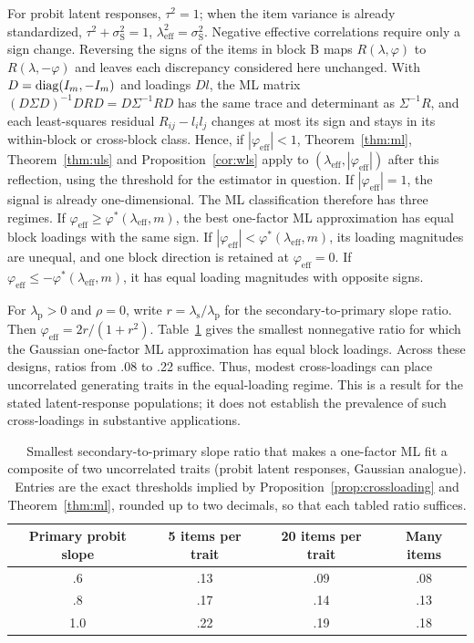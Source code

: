 For probit latent responses, $\tau^2=1$; when the item variance is already standardized, $\tau^2+\sigma_{\mathrm S}^2=1$, $\lambda_{\mathrm{eff}}^2=\sigma_{\mathrm S}^2$. Negative effective correlations require only a sign change. Reversing the signs of the items in block B maps $R(\lambda,\varphi)$ to $R(\lambda,-\varphi)$ and leaves each discrepancy considered here unchanged. With $D=\operatorname{diag}(I_m,-I_m)$ and loadings $Dl$, the ML matrix $(D\Sigma D)^{-1}DRD=D\Sigma^{-1}RD$ has the same trace and determinant as $\Sigma^{-1}R$, and each least-squares residual $R_{ij}-l_il_j$ changes at most its sign and stays in its within-block or cross-block class. Hence, if $|\varphi_{\mathrm{eff}}|<1$, Theorem~\ref{thm:ml}, Theorem~\ref{thm:uls} and Proposition~\ref{cor:wls} apply to $(\lambda_{\mathrm{eff}},|\varphi_{\mathrm{eff}}|)$ after this reflection, using the threshold for the estimator in question. If $|\varphi_{\mathrm{eff}}|=1$, the signal is already one-dimensional. The ML classification therefore has three regimes. If $\varphi_{\mathrm{eff}}\ge\varphi^*(\lambda_{\mathrm{eff}},m)$, the best one-factor ML approximation has equal block loadings with the same sign. If $|\varphi_{\mathrm{eff}}|<\varphi^*(\lambda_{\mathrm{eff}},m)$, its loading magnitudes are unequal, and one block direction is retained at $\varphi_{\mathrm{eff}}=0$. If $\varphi_{\mathrm{eff}}\le-\varphi^*(\lambda_{\mathrm{eff}},m)$, it has equal loading magnitudes with opposite signs.

For $\lambda_{\mathrm p}>0$ and $\rho=0$, write $r=\lambda_{\mathrm s}/\lambda_{\mathrm p}$ for the secondary-to-primary slope ratio. Then $\varphi_{\mathrm{eff}}=2r/(1+r^2)$. Table~\ref{tab:2} gives the smallest nonnegative ratio for which the Gaussian one-factor ML approximation has equal block loadings. Across these designs, ratios from .08 to .22 suffice. Thus, modest cross-loadings can place uncorrelated generating traits in the equal-loading regime. This is a result for the stated latent-response populations; it does not establish the prevalence of such cross-loadings in substantive applications.

\begin{table}[t]
\centering\small
\caption{Smallest secondary-to-primary slope ratio that makes a one-factor ML fit a composite of two uncorrelated traits (probit latent responses, Gaussian analogue). Entries are the exact thresholds implied by Proposition~\ref{prop:crossloading} and Theorem~\ref{thm:ml}, rounded up to two decimals, so that each tabled ratio suffices.}
\label{tab:2}
\begin{tabular}{cccc}
\toprule
Primary probit slope & 5 items per trait & 20 items per trait & Many items \\
\midrule
.6 & .13 & .09 & .08 \\
.8 & .17 & .14 & .13 \\
1.0 & .22 & .19 & .18 \\
\bottomrule
\end{tabular}
\end{table}

